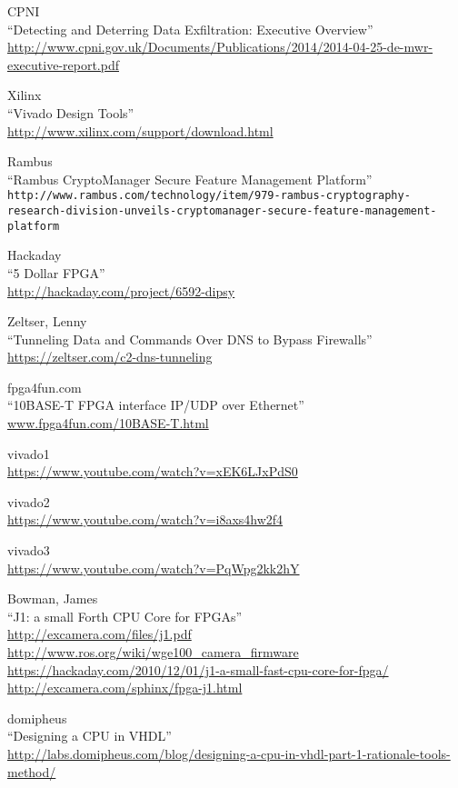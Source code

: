 \begin{thebibliography}{99}
 CPNI\\
``Detecting and Deterring Data Exfiltration: Executive Overview''\\
\url{http://www.cpni.gov.uk/Documents/Publications/2014/2014-04-25-de-mwr-executive-report.pdf}

 Xilinx\\
``Vivado Design Tools''\\
\url{http://www.xilinx.com/support/download.html}

 Rambus\\
``Rambus CryptoManager Secure Feature Management Platform''\\
\verb|http://www.rambus.com/technology/item/979-rambus-cryptography-|
\verb|research-division-unveils-cryptomanager-secure-feature-management-platform|

 Hackaday\\
``5 Dollar FPGA''\\
\url{http://hackaday.com/project/6592-dipsy}

 Zeltser, Lenny\\
``Tunneling Data and Commands Over DNS to Bypass Firewalls''\\
\url{https://zeltser.com/c2-dns-tunneling}

 fpga4fun.com\\
``10BASE-T FPGA interface IP/UDP over Ethernet''\\
\url{www.fpga4fun.com/10BASE-T.html}

 vivado1\\
\url{https://www.youtube.com/watch?v=xEK6LJxPdS0}

 vivado2\\
\url{https://www.youtube.com/watch?v=i8axs4hw2f4}

 vivado3\\
\url{https://www.youtube.com/watch?v=PqWpg2kk2hY}

 Bowman, James\\
``J1: a small Forth CPU Core for FPGAs''\\
\url{http://excamera.com/files/j1.pdf}\\
\url{http://www.ros.org/wiki/wge100_camera_firmware}
\url{https://hackaday.com/2010/12/01/j1-a-small-fast-cpu-core-for-fpga/}
\url{http://excamera.com/sphinx/fpga-j1.html}

 domipheus\\
``Designing a CPU in VHDL''\\
\url{http://labs.domipheus.com/blog/designing-a-cpu-in-vhdl-part-1-rationale-tools-method/}


\end{thebibliography}

